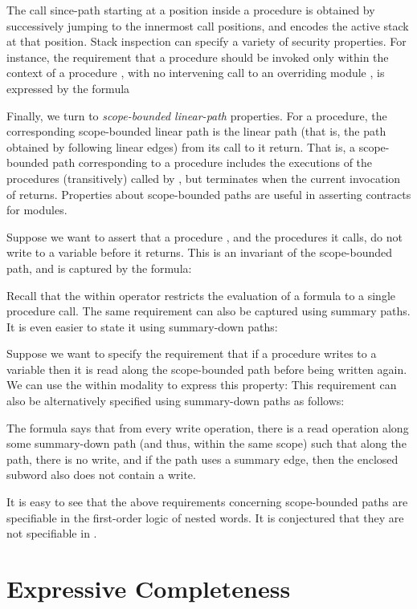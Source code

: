 \documentclass{LMCS}
\theoremstyle{plain}
\theoremstyle{definition}
\newcommand{\caret}{\text{CaRet}}
\begin{document}
The call since-path starting at a position inside a procedure  is
obtained by successively jumping to the innermost call positions, and
encodes the active stack at that position.  Stack inspection can
specify a variety of security properties. For instance, the
requirement that a procedure  should be invoked only within the
context of a procedure , with no intervening call to an overriding
module , is expressed by the formula 

Finally, we turn to {\em scope-bounded linear-path\/} properties.  For
a procedure, the corresponding scope-bounded linear path is the linear
path (that is, the path obtained by following linear edges) from its
call to it return.  That is, a scope-bounded path corresponding to a
procedure  includes the executions of the procedures (transitively)
called by , but terminates when the current invocation of 
returns.  Properties about scope-bounded paths are useful in asserting
contracts for modules.

Suppose we want to assert that a procedure , and the procedures it
calls, do not write to a variable before it returns.  This is an
invariant of the scope-bounded path, and is captured by the formula:
 
Recall that the within operator  restricts the evaluation of a
formula to a single procedure call. 
The same requirement can also be captured using summary
paths. It is even easier to state it using summary-down paths:
  

Suppose we want to specify the requirement that if a procedure writes
to a variable then it is read along the scope-bounded path before
being written again.  We can use the within modality to express this
property:  This requirement can also
be alternatively specified using summary-down paths as follows:

The formula says that from every write operation, there is a read
operation along some summary-down path (and thus, within the same
scope) such that along the path, there is no write, and if the path
uses a summary edge, then the enclosed subword also does not contain a
write.


It is easy to see that the above requirements 
concerning scope-bounded paths are specifiable in the first-order
logic of nested words. It is conjectured that they
are not specifiable in \caret{}. 


\section{Expressive Completeness}
\label{expcompl-sec}
\end{document}
